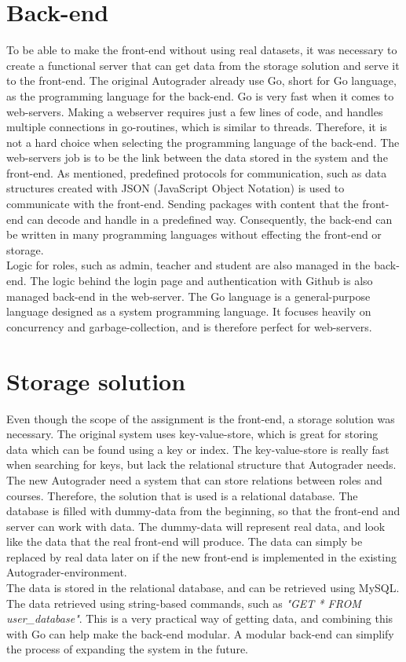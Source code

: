 \section{Back-end}
To be able to make the front-end without using real datasets, it was necessary to create a functional server that can get data from the storage solution and serve it to the front-end. The original Autograder already use Go, short for Go language, as the programming language for the back-end. Go is very fast when it comes to web-servers. Making a webserver requires just a few lines of code, and handles multiple connections in go-routines, which is similar to threads. Therefore, it is not a hard choice when selecting the programming language of the back-end. The web-servers job is to be the link between the data stored in the system and the front-end. As mentioned, predefined protocols for communication, such as data structures created with JSON (JavaScript Object Notation) is used to communicate with the front-end. Sending packages with content that the front-end can decode and handle in a predefined way. Consequently, the back-end can be written in many programming languages without effecting the front-end or storage. \\Logic for roles, such as admin, teacher and student are also managed in the back-end. The logic behind the login page and authentication with Github is also managed back-end in the web-server. The Go language is a general-purpose language designed as a system programming language. It focuses heavily on concurrency and garbage-collection, and is therefore perfect for web-servers.

\section{Storage solution}
Even though the scope of the assignment is the front-end, a storage solution was necessary. The original system uses key-value-store, which is great for storing data which can be found using a key or index. The key-value-store is really fast when searching for keys, but lack the relational structure that Autograder needs. The new Autograder need a system that can store relations between roles and courses. Therefore, the solution that is used is a relational database. The database is filled with dummy-data from the beginning, so that the front-end and server can work with data. The dummy-data will represent real data, and look like the data that the real front-end will produce. The data can simply be replaced by real data later on if the new front-end is implemented in the existing Autograder-environment. \\The data is stored in the relational database, and can be retrieved using MySQL. The data retrieved using string-based commands, such as \emph{"GET * FROM user\_database"}. This is a very practical way of getting data, and combining this with Go can help make the back-end modular. A modular back-end can simplify the process of expanding the system in the future.